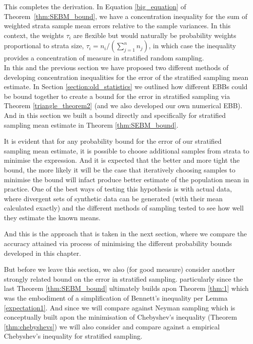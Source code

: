 This completes the derivation.
In Equation \eqref{big_equation} of Theorem~\ref{thm:SEBM_bound}, we have a concentration inequality for the sum of weighted strata sample mean errors relative to the sample variances. 
In this context, the weights $\tau_i$ are flexible but would naturally be probability weights proportional to strata size,  $\tau_i=n_i/(\sum_{j=1}^nn_j)$, 
in which case the inequality provides a concentration of measure in stratified random sampling.\\



In this and the previous section we have proposed two different methods of developing concentration inequalities for the error of the stratified sampling mean estimate.
In Section \ref{section:old_statistics} we outlined how different EBBs could be bound together to create a bound for the error in stratified sampling via Theorem \ref{triangle_theorem2} (and we also developed our own numerical EBB).
And in this section we built a bound directly and specifically for stratified sampling mean estimate in Theorem \ref{thm:SEBM_bound}.

It is evident that for any probability bound for the error of our stratified sampling mean estimate, it is possible to choose additional samples from strata to minimise the expression.
And it is expected that the better and more tight the bound, the more likely it will be the case that iteratively choosing samples to minimise the bound will infact produce better estimate of the population mean in practice.
One of the best ways of testing this hypothesis is with actual data, where divergent sets of synthetic data can be generated (with their mean calculated exactly) and the different methods of sampling tested to see how well they estimate the known means.

And this is the approach that is taken in the next section, where we compare the accuracy attained via process of minimising the different probability bounds developed in this chapter.

But before we leave this section, we also (for good measure) consider another strongly related bound on the error in stratified sampling.
particularly since the last Theorem \ref{thm:SEBM_bound} ultimately builds apon Theorem \ref{thm:1} which was the embodiment of a simplification of Bennett's inequality per Lemma \ref{expectation1}.
And since we will compare against Neyman sampling which is conceptually built apon the minimisation of Chebyshev's inequality (Theorem \ref{thm:chebyshevs}) we will also consider and compare against a empirical Chebyshev's inequality for stratified sampling.



